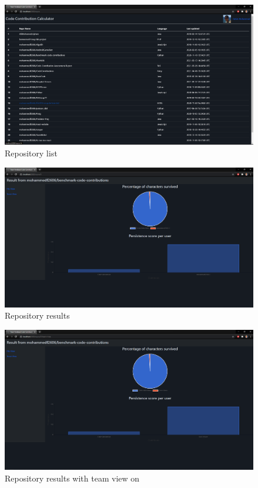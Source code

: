 \begin{figure}
    \centering
    \includegraphics[scale=0.3]{Appendices/Screenshot_93.png}
    \caption{Repository list}
    \label{fig:sc2}
\end{figure}
\begin{figure}
    \centering
    \includegraphics[scale=0.3]{Appendices/Screenshot_94.png}
    \caption{Repository results}
    \label{fig:sc3}
\end{figure}
\begin{figure}
    \centering
    \includegraphics[scale=0.3]{Appendices/Screenshot_95.png}
    \caption{Repository results with team view on}
    \label{fig:sc4}
\end{figure}
